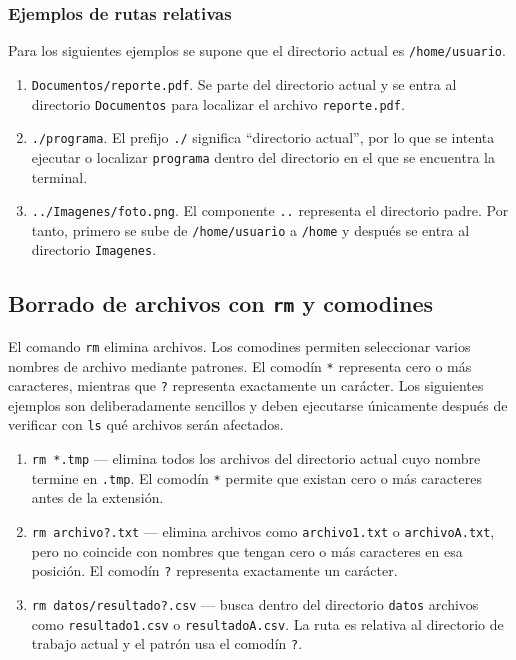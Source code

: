 \subsubsection{Ejemplos de rutas relativas}
Para los siguientes ejemplos se supone que el directorio actual es \texttt{/home/usuario}.

\begin{enumerate}[leftmargin=*]
    \item \texttt{Documentos/reporte.pdf}. Se parte del directorio actual y se entra al directorio \texttt{Documentos} para localizar el archivo \texttt{reporte.pdf}.
    \item \texttt{./programa}. El prefijo \texttt{./} significa ``directorio actual'', por lo que se intenta ejecutar o localizar \texttt{programa} dentro del directorio en el que se encuentra la terminal.
    \item \texttt{../Imagenes/foto.png}. El componente \texttt{..} representa el directorio padre. Por tanto, primero se sube de \texttt{/home/usuario} a \texttt{/home} y después se entra al directorio \texttt{Imagenes}.
\end{enumerate}

\subsection{Borrado de archivos con \texttt{rm} y comodines}
\label{sec:prac01:rm-comodines}
El comando \texttt{rm} elimina archivos. Los comodines permiten seleccionar varios nombres de archivo mediante patrones. El comodín \texttt{*} representa cero o más caracteres, mientras que \texttt{?} representa exactamente un carácter. Los siguientes ejemplos son deliberadamente sencillos y deben ejecutarse únicamente después de verificar con \texttt{ls} qué archivos serán afectados.

\begin{enumerate}[leftmargin=*]
    \item \texttt{rm *.tmp} --- elimina todos los archivos del directorio actual cuyo nombre termine en \texttt{.tmp}. El comodín \texttt{*} permite que existan cero o más caracteres antes de la extensión.
    \item \texttt{rm archivo?.txt} --- elimina archivos como \texttt{archivo1.txt} o \texttt{archivoA.txt}, pero no coincide con nombres que tengan cero o más caracteres en esa posición. El comodín \texttt{?} representa exactamente un carácter.
    \item \texttt{rm datos/resultado?.csv} --- busca dentro del directorio \texttt{datos} archivos como \texttt{resultado1.csv} o \texttt{resultadoA.csv}. La ruta es relativa al directorio de trabajo actual y el patrón usa el comodín \texttt{?}.
\end{enumerate}

